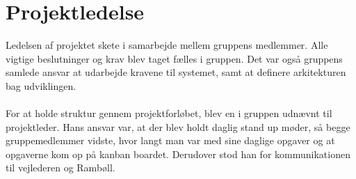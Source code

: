 \section{Projektledelse}
Ledelsen af projektet skete i samarbejde mellem gruppens medlemmer. Alle vigtige beslutninger og krav blev taget fælles i gruppen.
Det var også gruppens samlede ansvar at udarbejde kravene til systemet, samt at definere arkitekturen bag udviklingen. \\ \\
For at holde struktur gennem projektforløbet, blev en i gruppen udnævnt til projektleder. Hans ansvar var, at der blev holdt daglig stand up møder, så begge gruppemedlemmer vidste, hvor langt man var med sine daglige opgaver og at opgaverne kom op på kanban boardet. Derudover stod han for kommunikationen til vejlederen og Rambøll.

\clearpage
